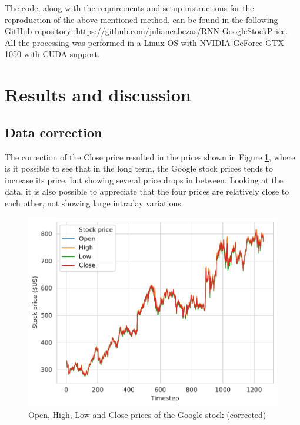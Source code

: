 \documentclass[10pt,twocolumn,letterpaper]{article}
\begin{document}
The code, along with the requirements and setup instructions for the reproduction of the above-mentioned method, can be found in the following GitHub repository: \url{https://github.com/juliancabezas/RNN-GoogleStockPrice}. All the processing was performed in a Linux OS with NVIDIA GeForce GTX 1050 with CUDA support.

\section{Results and discussion}



\subsection{Data correction}

The correction of the Close price resulted in the prices shown in Figure \ref{fig:price_corrected}, where is it possible to see that in the long term, the Google stock prices tends to increase its price, but showing several price drops in between. Looking at the data, it is also possible to appreciate that the four prices are relatively close to each other, not showing large intraday variations. 

\begin{figure}[h]
	\begin{center}
		\includegraphics[width=1.0\linewidth]{stock_price_corrected.pdf}
	\end{center}
	\caption{Open, High, Low and Close prices of the Google stock (corrected)}
	\label{fig:price_corrected}
\end{figure}
\end{document}
